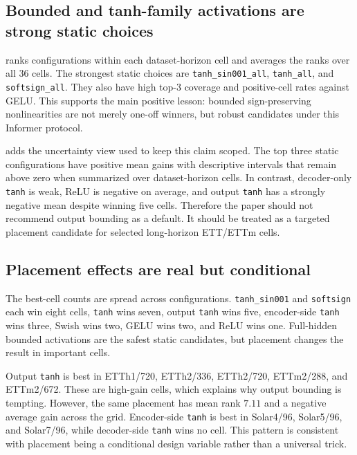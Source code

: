 \subsection{Bounded and tanh-family activations are strong static choices}

 ranks configurations within each dataset-horizon cell and averages the ranks over all 36 cells. The strongest static choices are \texttt{tanh\_sin001\_all}, \texttt{tanh\_all}, and \texttt{softsign\_all}. They also have high top-3 coverage and positive-cell rates against GELU. This supports the main positive lesson: bounded sign-preserving nonlinearities are not merely one-off winners, but robust candidates under this Informer protocol.



 adds the uncertainty view used to keep this claim scoped. The top three static configurations have positive mean gains with descriptive intervals that remain above zero when summarized over dataset-horizon cells. In contrast, decoder-only \texttt{tanh} is weak, ReLU is negative on average, and output \texttt{tanh} has a strongly negative mean despite winning five cells. Therefore the paper should not recommend output bounding as a default. It should be treated as a targeted placement candidate for selected long-horizon ETT/ETTm cells.



\subsection{Placement effects are real but conditional}

The best-cell counts are spread across configurations. \texttt{tanh\_sin001} and \texttt{softsign} each win eight cells, \texttt{tanh} wins seven, output \texttt{tanh} wins five, encoder-side \texttt{tanh} wins three, Swish wins two, GELU wins two, and ReLU wins one. Full-hidden bounded activations are the safest static candidates, but placement changes the result in important cells.

Output \texttt{tanh} is best in ETTh1/720, ETTh2/336, ETTh2/720, ETTm2/288, and ETTm2/672. These are high-gain cells, which explains why output bounding is tempting. However, the same placement has mean rank \(7.11\) and a negative average gain across the grid. Encoder-side \texttt{tanh} is best in Solar4/96, Solar5/96, and Solar7/96, while decoder-side \texttt{tanh} wins no cell. This pattern is consistent with placement being a conditional design variable rather than a universal trick.

